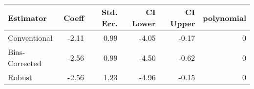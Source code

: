 \begin{tabular}{lrrrrr}
  \hline
Estimator & Coeff & Std. Err. & CI Lower & CI Upper & polynomial \\ 
  \hline
Conventional & -2.11 & 0.99 & -4.05 & -0.17 &   0 \\ 
  Bias-Corrected & -2.56 & 0.99 & -4.50 & -0.62 &   0 \\ 
  Robust & -2.56 & 1.23 & -4.96 & -0.15 &   0 \\ 
   \hline
\end{tabular}
